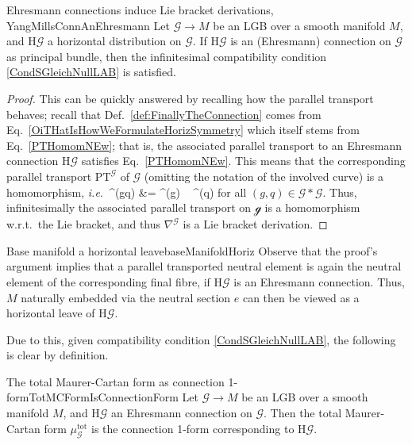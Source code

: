 \documentclass[a4paper,oneside,11pt,bibliography=totoc]{scrartcl}
\def\bas#1\eas{\begin{align*}#1\end{align*}}
\theoremstyle{plain}
\theoremstyle{remark}
\theoremstyle{definition}
\begin{document}
\begin{lemmata}{Ehresmann connections induce Lie bracket derivations, \newline \cite[\S 4.5, Prop.\ 4.21]{LAURENTGENGOUXStienonXuMultiplicativeForms}}{YangMillsConnAnEhresmann}
Let $\mathcal{G} \to M$ be an LGB over a smooth manifold $M$, and $\mathrm{H}\mathcal{G}$ a horizontal distribution on $\mathcal{G}$. If $\mathrm{H}\mathcal{G}$ is an (Ehresmann) connection on $\mathcal{G}$ as principal bundle, then the infinitesimal compatibility condition \eqref{CondSGleichNullLAB} is satisfied.
\end{lemmata}

\begin{proof}
\leavevmode\newline
This can be quickly answered by recalling how the parallel transport behaves; recall that Def.\ \ref{def:FinallyTheConnection} comes from Eq.\ \eqref{OiTHatIsHowWeFormulateHorizSymmetry} which itself stems from Eq.\ \eqref{PTHomomNEw}; that is, the associated parallel transport to an Ehresmann connection $\mathrm{H}\mathcal{G}$ satisfies Eq.\ \eqref{PTHomomNEw}. This means that the corresponding parallel transport $\mathrm{PT}^{\mathcal{G}}$ of $\mathcal{G}$ (omitting the notation of the involved curve) is a homomorphism, \textit{i.e.}\
\bas
\mathrm{PT}^{}(gq)
&=
^{}(g) ~ ^{}(q)
\eas
for all $(g, q) \in \mathcal{G} * \mathcal{G}$. Thus, infinitesimally the associated parallel transport on $\mathcal{g}$ is a homomorphism w.r.t.\ the Lie bracket, and thus $\nabla^{\mathcal{G}}$ is a Lie bracket derivation.
\end{proof}

\begin{remarks}{Base manifold a horizontal leave}{baseManifoldHoriz}
Observe that the proof's argument implies that a parallel transported neutral element is again the neutral element of the corresponding final fibre, if $\mathrm{H}\mathcal{G}$ is an Ehresmann connection. Thus, $M$ naturally embedded via the neutral section $e$ can then be viewed as a horizontal leave of $\mathrm{H}\mathcal{G}$.
\end{remarks}

Due to this, given compatibility condition \eqref{CondSGleichNullLAB}, the following is clear by definition.

\begin{corollaries}{The total Maurer-Cartan form as connection 1-form}{TotMCFormIsConnectionForm}
Let $\mathcal{G} \to M$ be an LGB over a smooth manifold $M$, and $\mathrm{H}\mathcal{G}$ an Ehresmann connection on $\mathcal{G}$. Then the total Maurer-Cartan form $\mu_{\mathcal{G}}^{\mathrm{tot}}$ is the connection 1-form corresponding to $\mathrm{H}\mathcal{G}$.
\end{corollaries}
\end{document}
